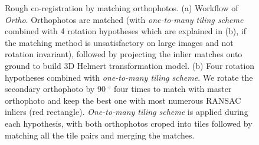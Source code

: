 \begin{figure}[htbp]
    \begin{center}
        \caption{Rough co-registration by matching orthophotos. (a) Workflow of \textit{Ortho}. Orthophotos are matched (with \textit{one-to-many tiling scheme} combined with 4 rotation hypotheses which are explained in (b), if the matching method is unsatisfactory on large images and not rotation invariant), followed by projecting the inlier matches onto ground to build 3D Helmert transformation model. (b) Four rotation hypotheses combined with \textit{one-to-many tiling scheme}. We rotate the secondary orthophoto by 90 $^\circ$ four times to match with master orthophoto and keep the best one with most numerous RANSAC inliers (red rectangle). \textit{One-to-many tiling scheme} is applied during each hypothesis, with both orthophotos croped into tiles followed by matching all the tile pairs and merging the matches.}
        \label{WorkflowOrtho}
    \end{center}
\end{figure}

